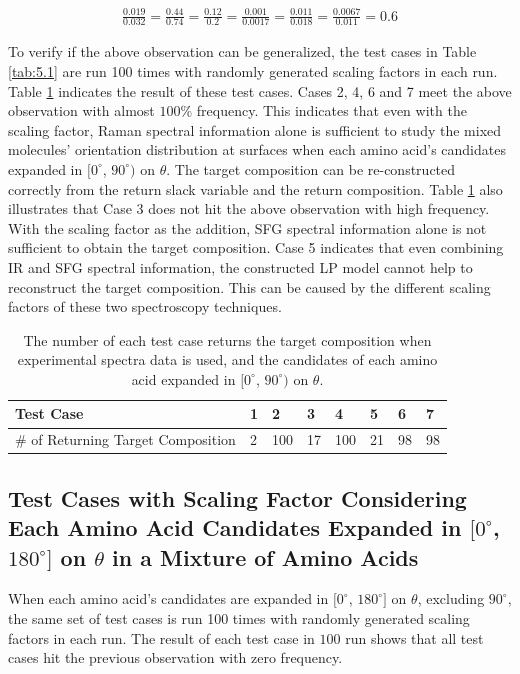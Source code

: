 \begin{eqnarray} \label{eqn:6.3}
\frac{0.019}{0.032} = \frac{0.44}{0.74} = \frac{0.12}{0.2} =\frac{0.001}{0.0017}  = \frac{0.011}{0.018} = \frac{0.0067}{0.011} = 0.6
\end{eqnarray}

To verify if the above observation can be generalized, the test cases in Table \ref{tab:5.1} are run 100 times with randomly generated scaling factors in each run. Table \ref{tab:6.1} indicates the result of these test cases. Cases 2, 4, 6 and 7 meet the above observation with almost $100\%$ frequency. This indicates that even with the scaling factor, Raman spectral information alone is sufficient to study the mixed molecules' orientation distribution at surfaces when each amino acid's candidates expanded in $[0^{\circ}$, $90^{\circ})$ on $\theta$. The target composition can be re-constructed correctly from the return slack variable and the return composition. Table \ref{tab:6.1} also illustrates that Case 3 does not hit the above observation with high frequency. With the scaling factor as the addition, SFG spectral information alone is not sufficient to obtain the target composition. Case 5 indicates that even combining IR and SFG spectral information, the constructed LP model cannot help to reconstruct the target composition. This can be caused by the different scaling factors of these two spectroscopy techniques. \\

\begin{table}[ht!]
\begin{center}
{\def\arraystretch{1.5}
\begin{tabular}{| l | l | l | l | l | l | l | l |}
\hline
Test Case & 1 & 2 & 3 & 4 & 5 & 6 & 7 \\ \hline
\# of Returning Target Composition& 2 & 100 & 17 & 100 & 21 & 98 & 98 \\ \hline
\end{tabular} 
}
\end{center}
\caption{The number of each test case returns the target composition when experimental spectra data is used, and the candidates of each amino acid expanded in $[0^{\circ}$, $90^{\circ})$ on $\theta$.}
\label{tab:6.1}
\end{table}	


\subsection{Test Cases with Scaling Factor Considering Each Amino Acid Candidates Expanded in $[0^{\circ}$, $180^{\circ}]$ on $\theta$ in a Mixture of Amino Acids}
When each amino acid's candidates are expanded in $[0^{\circ}$, $180^{\circ}]$ on $\theta$, excluding $90^{\circ}$, the same set of test cases is run 100 times with randomly generated scaling factors in each run. The result of each test case in $100$ run shows that all test cases hit the previous observation with zero frequency. \\

